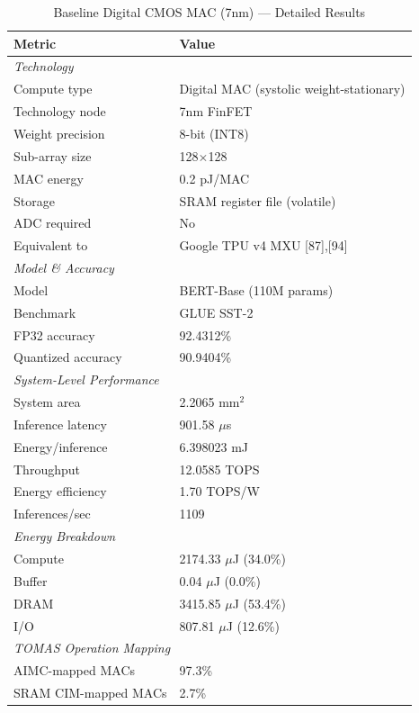 \begin{table}[htbp]
\centering
\caption{Baseline Digital CMOS MAC (7nm) --- Detailed Results}
\label{tab:baseline_detail}
\begin{tabular}{ll}
\toprule
\textbf{Metric} & \textbf{Value} \\
\midrule
\multicolumn{2}{l}{\textit{Technology}} \\
\quad Compute type & Digital MAC (systolic weight-stationary) \\
\quad Technology node & 7nm FinFET \\
\quad Weight precision & 8-bit (INT8) \\
\quad Sub-array size & 128$\times$128 \\
\quad MAC energy & 0.2 pJ/MAC \\
\quad Storage & SRAM register file (volatile) \\
\quad ADC required & No \\
\quad Equivalent to & Google TPU v4 MXU [87],[94] \\
\midrule
\multicolumn{2}{l}{\textit{Model \& Accuracy}} \\
\quad Model & BERT-Base (110M params) \\
\quad Benchmark & GLUE SST-2 \\
\quad FP32 accuracy & 92.4312\% \\
\quad Quantized accuracy & 90.9404\% \\
\midrule
\multicolumn{2}{l}{\textit{System-Level Performance}} \\
\quad System area & 2.2065 mm$^2$ \\
\quad Inference latency & 901.58 $\mu$s \\
\quad Energy/inference & 6.398023 mJ \\
\quad Throughput & 12.0585 TOPS \\
\quad Energy efficiency & 1.70 TOPS/W \\
\quad Inferences/sec & 1109 \\
\midrule
\multicolumn{2}{l}{\textit{Energy Breakdown}} \\
\quad Compute & 2174.33 $\mu$J (34.0\%) \\
\quad Buffer & 0.04 $\mu$J (0.0\%) \\
\quad DRAM & 3415.85 $\mu$J (53.4\%) \\
\quad I/O & 807.81 $\mu$J (12.6\%) \\
\midrule
\multicolumn{2}{l}{\textit{TOMAS Operation Mapping}} \\
\quad AIMC-mapped MACs & 97.3\% \\
\quad SRAM CIM-mapped MACs & 2.7\% \\
\bottomrule
\end{tabular}
\end{table}
